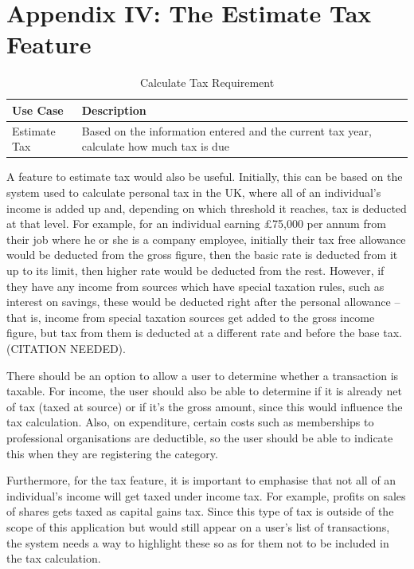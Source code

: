 \section{Appendix IV: The Estimate Tax Feature} \label{appendix4}


\begin{table}[ht!]
  \centering
  \begin{tabular}{|p{4cm}|p{12cm}|}
    \hline
    \textbf{Use Case}&\textbf{Description}\\
    \hline
    Estimate Tax&Based on the information entered and the current tax year,
                 calculate how much tax is due\\
    \hline
  \end{tabular}
  \caption{Calculate Tax Requirement}
\end{table}
\FloatBarrier

A feature to estimate tax would also be useful. Initially, this can be based on
the system used to calculate personal tax in the UK, where all of an
individual's income is added up and, depending on which threshold it reaches,
tax is deducted at that level. For example, for an individual earning
\pounds75,000 per annum from their job where he or she is a company employee,
initially their tax free allowance would be deducted from the gross figure,
then the basic rate is deducted from it up to its limit, then higher rate would
be deducted from the rest. However, if they have any income from sources which
have special taxation rules, such as interest on savings, these would be
deducted right after the personal allowance -- that is, income from special
taxation sources get added to the gross income figure, but tax from them is
deducted at a different rate and before the base tax. (\textsc{CITATION
NEEDED}).

There should be an option to allow a user to determine whether a transaction is
taxable. For income, the user should also be able to determine if it is already
net of tax (taxed at source) or if it's the gross amount, since this would
influence the tax calculation. Also, on expenditure, certain costs such as
memberships to professional organisations are deductible, so the user should be
able to indicate this when they are registering the category.

Furthermore, for the tax feature, it is important to emphasise that not all of
an individual's income will get taxed under income tax. For example, profits on
sales of shares gets taxed as capital gains tax. Since this type of tax is
outside of the scope of this application but would still appear on a user's
list of transactions, the system needs a way to highlight these so as for them
not to be included in the tax calculation.



